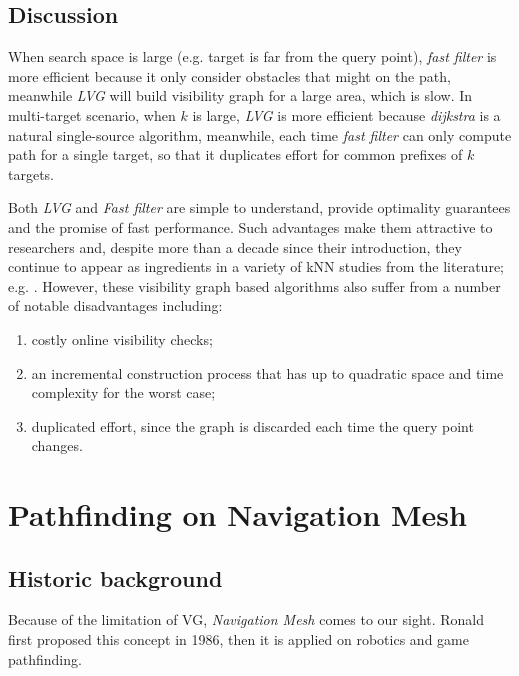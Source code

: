 \subsection{Discussion}
When search space is large (e.g. target is far from the query point), \textit{fast
filter}\cite{xia2004fast} is
more efficient because it only consider obstacles that might on the path, meanwhile
\textit{LVG}\cite{zhang2004spatial} will build visibility graph for a large area, which is slow. 
In multi-target scenario, when $k$ is large, \textit{LVG}\cite{zhang2004spatial} is more efficient because
\textit{dijkstra} is a natural single-source algorithm, meanwhile, each time \textit{fast
filter}\cite{xia2004fast} can
only compute path for a single target, so that it duplicates effort for common prefixes of $k$
targets.

Both \textit{LVG}\cite{zhang2004spatial} and \textit{Fast filter}\cite{xia2004fast} are simple to understand,
provide optimality guarantees and the promise of fast performance. Such advantages make them
attractive to researchers and, despite more than a decade since their introduction,
they continue to appear as ingredients in a variety of kNN studies from the literature; e.g.
\cite{gao2011efficient,gao2016reverse}.
However, these visibility graph based algorithms also suffer from a number of notable
disadvantages including:
\begin{enumerate}[label=(\roman*)]
  \item costly online visibility checks;
  \item an incremental construction process that has up to quadratic space and time complexity for the worst case;
  \item duplicated effort, since the graph is discarded each time the query point changes.
\end{enumerate}

\section{Pathfinding on Navigation Mesh}\label{lrnav}

\subsection{Historic background}
Because of the limitation of VG, \textit{Navigation Mesh} comes to our sight.
Ronald first proposed this concept in 1986\cite{ronald1986pathfinding}, then it is applied on
robotics and game pathfinding.

